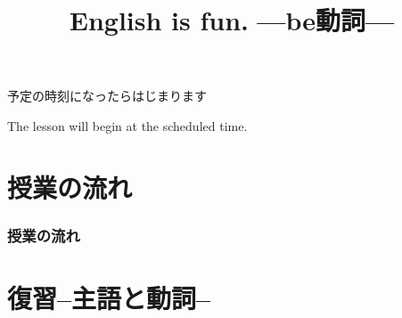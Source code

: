 \documentclass[aspectratio=169,xcolor={dvipsnames,table}]{beamer}
\title{English is fun.\,\,{}---be動詞---}
\author{}
\institute[]{}
\date[]
\newcommand{\myaudio}[1]{\href{#1}{\faVolumeUp}}
\begin{document}
\begin{frame}[label=waiting]{}
\thispagestyle{empty}
\Large
\raggedright

予定の時刻になったらはじまります

\vfill

\raggedleft

The lesson will begin at the scheduled time.
\end{frame}
\begin{frame}[label=title]
\thispagestyle{empty}
\titlepage
\end{frame}
%
%
%
%
%
%
%
\section*{授業の流れ}
\begin{frame}[plain]
  \frametitle{授業の流れ}
  \tableofcontents
\end{frame}
\section{復習--主語と動詞--}
\end{document}
